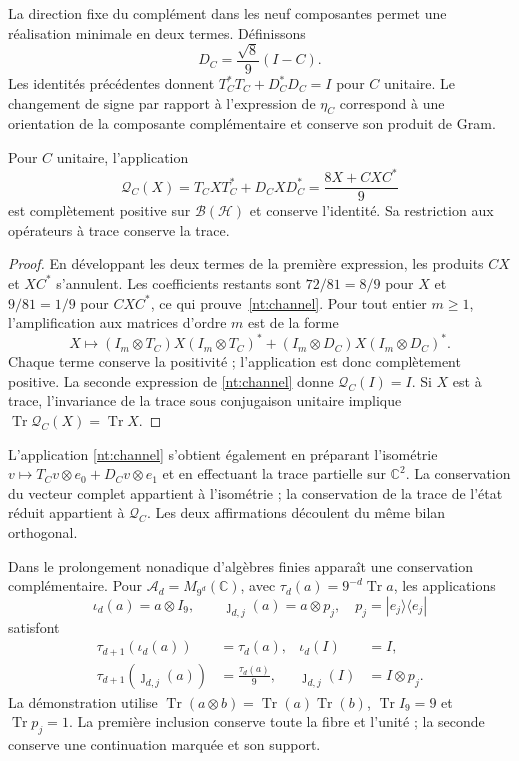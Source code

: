 La direction fixe du complément dans les neuf composantes
permet une réalisation minimale en deux termes. Définissons
\[
 D_C=\frac{\sqrt8}{9}(I-C).
\]
Les identités précédentes donnent
\(T_C^*T_C+D_C^*D_C=I\) pour \(C\) unitaire.
Le changement de signe par rapport à l’expression de
\(\eta_C\) correspond à une orientation de la composante
complémentaire et conserve son produit de Gram.

\begin{proposition}
Pour \(C\) unitaire, l’application
\begin{equation}
 \mathcal Q_C(X)=T_CXT_C^*+D_CXD_C^*
              =\frac{8X+CXC^*}{9}
 \label{nt:channel}
\end{equation}
est complètement positive sur \(\mathcal B(\mathcal H)\) et conserve l'identité. Sa restriction aux opérateurs à trace conserve la trace.
\end{proposition}

\begin{proof}
En développant les deux termes de la première expression,
les produits \(CX\) et \(XC^*\) s’annulent. Les coefficients
restants sont \(72/81=8/9\) pour \(X\) et \(9/81=1/9\)
pour \(CXC^*\), ce qui prouve~\eqref{nt:channel}.
Pour tout entier \(m\geq1\), l’amplification aux matrices
d’ordre \(m\) est de la forme
\[
 X\longmapsto
 (I_m\otimes T_C)X(I_m\otimes T_C)^*
 +(I_m\otimes D_C)X(I_m\otimes D_C)^*.
\]
Chaque terme conserve la positivité ; l’application est donc
complètement positive. La seconde expression de
\eqref{nt:channel} donne \(\mathcal Q_C(I)=I\).
Si \(X\) est à trace, l’invariance de la trace sous
conjugaison unitaire implique
\(\operatorname{Tr}\mathcal Q_C(X)=\operatorname{Tr}X\).
\end{proof}

L'application \eqref{nt:channel} s'obtient également en préparant l'isométrie \(v\mapsto T_Cv\otimes e_0+D_Cv\otimes e_1\) et en effectuant la trace partielle sur \(\mathbb C^2\). La conservation du vecteur complet appartient à l'isométrie ; la conservation de la trace de l'état réduit appartient à \(\mathcal Q_C\). Les deux affirmations découlent du même bilan orthogonal.

Dans le prolongement nonadique d’algèbres finies apparaît une
conservation complémentaire. Pour
\(\mathcal A_d=M_{9^d}(\mathbb C)\), avec
\(\tau_d(a)=9^{-d}\operatorname{Tr}a\), les applications
\[
 \iota_d(a)=a\otimes I_9,\qquad
 \jmath_{d,j}(a)=a\otimes p_j,
 \quad p_j=|e_j\rangle\langle e_j|
\]
satisfont
\begin{align}
 \tau_{d+1}(\iota_d(a))&=\tau_d(a),
 &\iota_d(I)&=I,\label{nt:unital-trace}\\
 \tau_{d+1}(\jmath_{d,j}(a))&=\frac{\tau_d(a)}9,
 &\jmath_{d,j}(I)&=I\otimes p_j.\label{nt:corner-trace}
\end{align}
La démonstration utilise
\(\operatorname{Tr}(a\otimes b)=
\operatorname{Tr}(a)\operatorname{Tr}(b)\),
\(\operatorname{Tr}I_9=9\) et \(\operatorname{Tr}p_j=1\).
La première inclusion conserve toute la fibre et l’unité ;
la seconde conserve une continuation marquée et son support.


